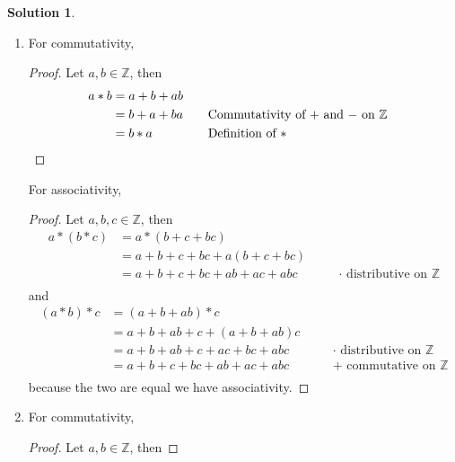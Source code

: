 \documentclass[10pt]{article}
\theoremstyle{definition}
\newtheorem{soln}{Solution}
\newcommand{\justif}[2]{&{#1}&\text{#2}}
\begin{document}
\begin{soln}~
  \begin{enumerate}[label=(\alph*)]
    \item For commutativity,
          \begin{proof}
            Let $a,b\in\mathbb{Z}$, then
            \begin{align*}
              a*b & = a+b+ab                                                            \\
                  & =b+a+ba\justif{\quad}{Commutativity of $+$ and $-$ on $\mathbb{Z}$} \\
                  & =b*a\justif{\quad}{Definition of $*$}\qedhere
            \end{align*}
          \end{proof}
          For associativity,
          \begin{proof}
            Let $a,b,c\in\mathbb{Z}$, then
            \begin{align*}
              a*(b*c) & = a*(b+c+bc)                                                                 \\
                      & = a + b+c+bc + a(b+c+bc)                                                     \\
                      & = a + b+c+bc + ab+ac+abc\justif{\quad}{$\cdot$ distributive on $\mathbb{Z}$} \\
            \end{align*}
            and
            \begin{align*}
              (a*b)*c & = (a+b+ab)*c                                                                  \\
                      & = a+b+ab + c + (a+b+ab)c                                                      \\
                      & = a+b+ab + c + ac+bc+abc \justif{\quad}{$\cdot$ distributive on $\mathbb{Z}$} \\
                      & = a+b+c+ bc + ab+ac+abc \justif{\quad}{$+$ commutative on $\mathbb{Z}$}       \\
            \end{align*}
            because the two are equal we have associativity. \qedhere
          \end{proof}
    \item For commutativity,
          \begin{proof}
            Let $a,b\in\mathbb{Z}$, then

\end{proof}
\end{enumerate}
\end{soln}
\end{document}
